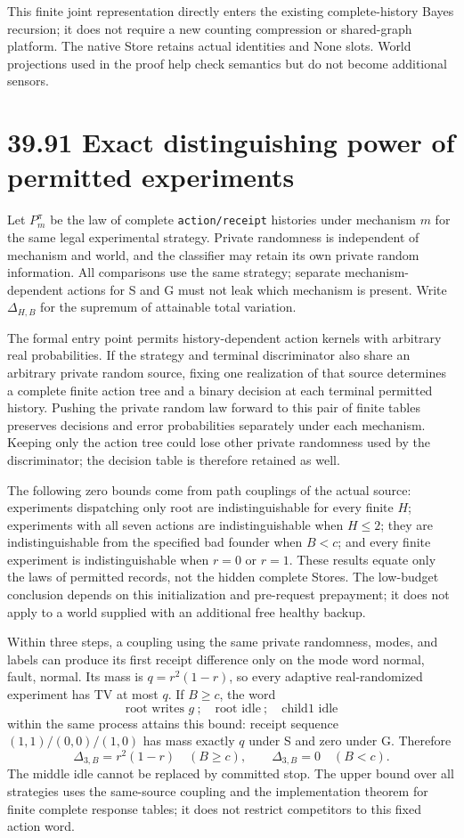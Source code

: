 \documentclass[
  english,
  11pt,
  oneside]{book}
\begin{document}
This finite joint representation directly enters the existing complete-history Bayes recursion; it does not require a new counting compression or shared-graph platform. The native Store retains actual identities and None slots. World projections used in the proof help check semantics but do not become additional sensors.

\section{39.91 Exact distinguishing power of permitted experiments}\label{exact-distinguishing-power-of-permitted-experiments}

Let \(P_m^\pi\) be the law of complete \nolinkurl{action/receipt} histories under mechanism \(m\) for the same legal experimental strategy. Private randomness is independent of mechanism and world, and the classifier may retain its own private random information. All comparisons use the same strategy; separate mechanism-dependent actions for S and G must not leak which mechanism is present. Write \(\Delta_{H,B}\) for the supremum of attainable total variation.

The formal entry point permits history-dependent action kernels with arbitrary real probabilities. If the strategy and terminal discriminator also share an arbitrary private random source, fixing one realization of that source determines a complete finite action tree and a binary decision at each terminal permitted history. Pushing the private random law forward to this pair of finite tables preserves decisions and error probabilities separately under each mechanism. Keeping only the action tree could lose other private randomness used by the discriminator; the decision table is therefore retained as well.

The following zero bounds come from path couplings of the actual source: experiments dispatching only root are indistinguishable for every finite \(H\); experiments with all seven actions are indistinguishable when \(H\le2\); they are indistinguishable from the specified bad founder when \(B<c\); and every finite experiment is indistinguishable when \(r=0\) or \(r=1\). These results equate only the laws of permitted records, not the hidden complete Stores. The low-budget conclusion depends on this initialization and pre-request prepayment; it does not apply to a world supplied with an additional free healthy backup.

Within three steps, a coupling using the same private randomness, modes, and labels can produce its first receipt difference only on the mode word normal, fault, normal. Its mass is \(q=r^2(1-r)\), so every adaptive real-randomized experiment has TV at most \(q\). If \(B\ge c\), the word \[\text{root writes }g\ ;\quad\text{root idle}\ ;\quad\text{child1 idle}\] within the same process attains this bound: receipt sequence \((1,1)/(0,0)/(1,0)\) has mass exactly \(q\) under S and zero under G. Therefore \[\Delta_{3,B}=r^2(1-r)\quad(B\ge c),\qquad\Delta_{3,B}=0\quad(B<c).\] The middle idle cannot be replaced by committed stop. The upper bound over all strategies uses the same-source coupling and the implementation theorem for finite complete response tables; it does not restrict competitors to this fixed action word.
\end{document}
